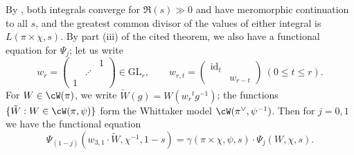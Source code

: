 \documentclass[10pt,reqno,a4paper]{amsart}
\newcommand{\stbt}[4]{\left(\begin{smallmatrix}#1 & #2\\#3&#4\end{smallmatrix}\right)}
\newcommand{\GL}{\mathrm{GL}}
\newcommand{\smallthreemat}[9]{\left(\begin{smallmatrix}
#1 & #2 & #3 \\
#4 & #5 & #6 \\
#7 & #8 & #9\end{smallmatrix}\right)}
\begin{document}
By \cite[Thm.\ 2.7(i),(ii)]{JPSS-RankinSelberg}, both integrals converge for $\Re(s) \gg 0$ and have meromorphic continuation to all $s$, and the greatest common divisor of the values of either integral is $L(\pi \times \chi, s)$. By part (iii) of the cited theorem, we also have a functional equation for $\Psi_j$; let us write
\[ w_r = \smallthreemat{}{}{1}{}{\iddots}{}{1}{}{} \in \GL_r, \qquad w_{r, t} = \stbt{\mathrm{id}_t}{}{}{w_{r-t}}\ (0 \le t \le r).\]
For $W \in \cW(\pi)$, we write $\tilde{W}(g) = W(w_r {}^t\! g^{-1})$; the functions $\{ \tilde{W} : W \in \cW(\pi, \psi)\}$ form the Whittaker model $\cW(\pi^\vee, \psi^{-1})$. Then for $j = 0, 1$ we have the functional equation
\begin{equation}\label{eq:JPSS functional equation}
\Psi_{(1-j)}(w_{3, 1} \cdot \tilde{W}, \chi^{-1}, 1-s) =
\gamma(\pi \times \chi, \psi, s) \cdot \Psi_j(W, \chi, s).
\end{equation}
\end{document}
